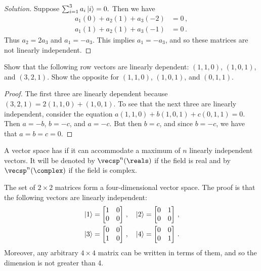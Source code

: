 \begin{proof}[Solution]
Suppose $\sum_{i = 1}^3 a_i \ket{i} = 0.$ Then we have
\begin{align}
    a_1(0) + a_2(1) + a_3(-2) &= 0\,, \\
    a_1(1) + a_2(1) + a_3(-1) &= 0\,.
\end{align}
Thus $a_2 = 2a_3$ and $a_1 = -a_3$. This implies $a_1 = -a_3$, and so these matrices are not linearly independent.
\end{proof}

\begin{exercise}
Show that the following row vectors are linearly dependent: $(1, 1, 0)$, $(1, 0, 1)$, and $(3, 2, 1)$. Show the opposite for $(1, 1, 0)$, $(1, 0, 1)$, and $(0, 1, 1)$.
\end{exercise}

\begin{proof}
The first three are linearly dependent because $(3, 2, 1) = 2(1, 1, 0) + (1, 0, 1)$. To see that the next three are linearly independent, consider the equation $a(1, 1, 0) + b(1, 0, 1) + c(0, 1, 1) = 0$. Then $a = -b$, $b = -c$, and $a = -c$. But then $b = c$, and since $b = -c$, we have that $a = b = c = 0$.
\end{proof}

\begin{shaded*}
A vector space has  if it can accommodate a maximum of $n$ linearly independent vectors. It will be denoted by $\vecsp^n(\reals)$ if the field is real and by $\vecsp^n(\complex)$ if the field is complex.
\end{shaded*}

\begin{example}
The set of $2 \times 2$ matrices form a four-dimensional vector space. The proof is that the following vectors are linearly independent:
\begin{align}
&\ket{1} = 
\begin{bmatrix}
1 & 0 \\
0 & 0
\end{bmatrix}\,,
\quad
\ket{2} = 
\begin{bmatrix}
0 & 1 \\
0 & 0
\end{bmatrix}\,,
\\
&\ket{3} = 
\begin{bmatrix}
0 & 0 \\
1 & 0
\end{bmatrix}\,,
\quad
\ket{4} = 
\begin{bmatrix}
0 & 0 \\
0 & 1
\end{bmatrix}\,.
\end{align}
Moreover, any arbitrary $4 \times 4$ matrix can be written in terms of them, and so the dimension is not greater than 4.
\end{example}

